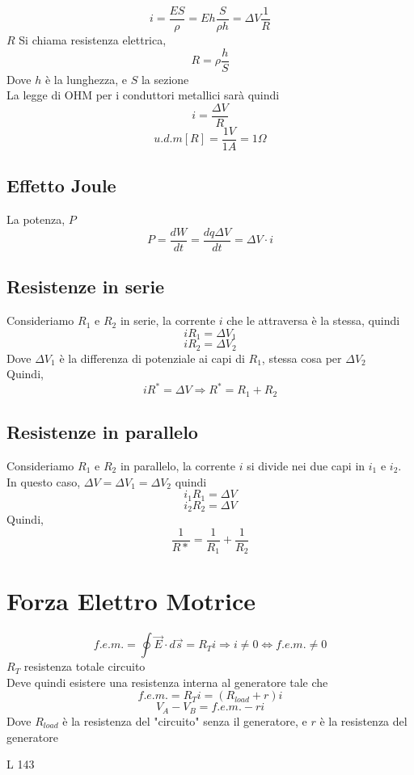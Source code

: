 \documentclass[a4paper]{report}
\begin{document}
  \[ i = \frac{ES}{\rho} = Eh \frac{S}{\rho h} = \Delta V \frac{1}{R} \]
  $R$ Si chiama resistenza elettrica,
  \[ R = \rho \frac{h}{S} \]
  Dove $h$ è la lunghezza, e $S$ la sezione\\

  La legge di OHM per i conduttori metallici sarà quindi
  \[ i = \frac{\Delta V}{R} \]
  \[ u.d.m[R] = \frac{1V}{1A} = 1 \Omega \]

  \subsection{Effetto Joule}
  La potenza, $P$
  \[ P=\frac{dW}{dt} = \frac{dq\Delta V}{dt} = \Delta V \cdot i\]

  \subsection{Resistenze in serie}
  Consideriamo $R_1$ e $R_2$ in serie, la corrente $i$ che le attraversa è la stessa, quindi
  \[ i R_1 = \Delta V_1 \]
  \[ i R_2 = \Delta V_2 \]
  Dove $\Delta V_1$ è la differenza di potenziale ai capi di $R_1$, stessa cosa per $\Delta V_2$\\
  Quindi,
  \[ i R^* = \Delta V \Rightarrow R^* = R_1 +R_2 \]

  \subsection{Resistenze in parallelo}
  Consideriamo $R_1$ e $R_2$ in parallelo, la corrente $i$ si divide nei due capi in $i_1$ e $i_2$. In questo caso, $\Delta V = \Delta V_1 = \Delta V_2$ quindi
  \[ i_1 R_1 = \Delta V \]
  \[ i_2 R_2 = \Delta V \]
  Quindi,
  \[ \frac{1}{R*} = \frac{1}{R_1} + \frac{1}{R_2} \]

  \section{Forza Elettro Motrice}
  \[ f.e.m. = \oint \vec{E} \cdot d\vec{s} = R_T i \Rightarrow i \neq 0 \iff f.e.m. \neq 0\]
  $R_T$ resistenza totale circuito\\
  Deve quindi esistere una resistenza interna al generatore tale che
  \[ f.e.m. = R_T i = (R_{load} + r)i \]
  \[ V_A - V_B = f.e.m. -ri \]
  Dove $R_{load}$ è la resistenza del "circuito" senza il generatore, e $r$ è la resistenza del generatore










L 143
\end{document}
